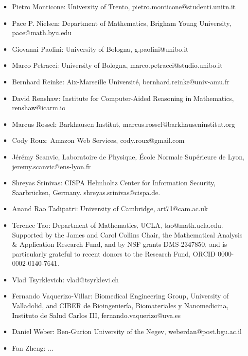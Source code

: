 \begin{itemize}
    \item Pietro Monticone: University of Trento, pietro.monticone@studenti.unitn.it
    \item Pace P. Nielsen: Department of Mathematics, Brigham Young University, pace@math.byu.edu
    \item Giovanni Paolini: University of Bologna, g.paolini@unibo.it
    \item Marco Petracci: University of Bologna, marco.petracci@studio.unibo.it
    \item Bernhard Reinke: Aix-Marseille Université, bernhard.reinke@univ-amu.fr
    \item David Renshaw: Institute for Computer-Aided Reasoning in Mathematics, renshaw@icarm.io
    \item Marcus Rossel: Barkhausen Institut, marcus.rossel@barkhauseninstitut.org
    \item Cody Roux: Amazon Web Services, cody.roux@gmail.com
    \item J\'er\'emy Scanvic, Laboratoire de Physique, École Normale Supérieure de Lyon, jeremy.scanvic@ens-lyon.fr
    \item Shreyas Srinivas: CISPA Helmholtz Center for Information Security, Saarbr\"{u}cken, Germany. shreyas.srinivas@cispa.de.
    \item Anand Rao Tadipatri: University of Cambridge, art71@cam.ac.uk
    \item Terence Tao: Department of Mathematics, UCLA, tao@math.ucla.edu. Supported by the James and Carol Collins Chair, the Mathematical Analysis \& Application Research Fund, and by NSF grants DMS-2347850, and is particularly grateful to recent donors to the Research Fund, ORCID 0000-0002-0140-7641.
    \item Vlad Tsyrklevich: vlad@tsyrklevi.ch
    \item Fernando Vaquerizo-Villar: Biomedical Engineering Group, University of Valladolid, and CIBER de Bioingeniería, Biomateriales y Nanomedicina, Instituto de Salud Carlos III, fernando.vaquerizo@uva.es
    \item Daniel Weber: Ben-Gurion University of the Negev, weberdan@post.bgu.ac.il
    \item Fan Zheng: ...

\end{itemize}
